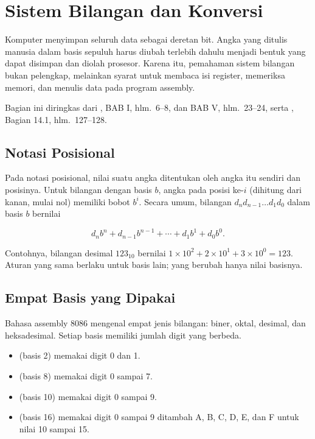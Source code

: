\section{Sistem Bilangan dan Konversi}
\label{sec:sistem-bilangan}

Komputer menyimpan seluruh data sebagai deretan bit. Angka yang
ditulis manusia dalam basis sepuluh harus diubah terlebih dahulu
menjadi bentuk yang dapat disimpan dan diolah prosesor. Karena itu,
pemahaman sistem bilangan bukan pelengkap, melainkan syarat untuk
membaca isi register, memeriksa memori, dan menulis data pada
program assembly.

Bagian ini diringkas dari \cite{sto2001}, BAB I, hlm.~6--8, dan
BAB V, hlm.~23--24, serta \cite{gunawan2019}, Bagian 14.1,
hlm.~127--128.

\subsection{Notasi Posisional}

Pada notasi posisional, nilai suatu angka ditentukan oleh angka itu
sendiri dan posisinya. Untuk bilangan dengan basis $b$, angka pada
posisi ke-$i$ (dihitung dari kanan, mulai nol) memiliki bobot $b^i$.
Secara umum, bilangan $d_n d_{n-1} \ldots d_1 d_0$ dalam basis $b$
bernilai

\[
    d_n b^n + d_{n-1} b^{n-1} + \cdots + d_1 b^1 + d_0 b^0.
\]

Contohnya, bilangan desimal $123_{10}$ bernilai
$1 \times 10^2 + 2 \times 10^1 + 3 \times 10^0 = 123$. Aturan yang
sama berlaku untuk basis lain; yang berubah hanya nilai basisnya.

\subsection{Empat Basis yang Dipakai}

Bahasa assembly 8086 mengenal empat jenis bilangan: biner, oktal,
desimal, dan heksadesimal. Setiap basis memiliki jumlah digit yang
berbeda.

\begin{itemize}
    \item {} (basis 2) memakai digit 0 dan 1.
    \item {} (basis 8) memakai digit 0 sampai 7.
    \item {} (basis 10) memakai digit 0 sampai 9.
    \item {} (basis 16) memakai digit 0 sampai 9
          ditambah A, B, C, D, E, dan F untuk nilai 10 sampai 15.
\end{itemize}

